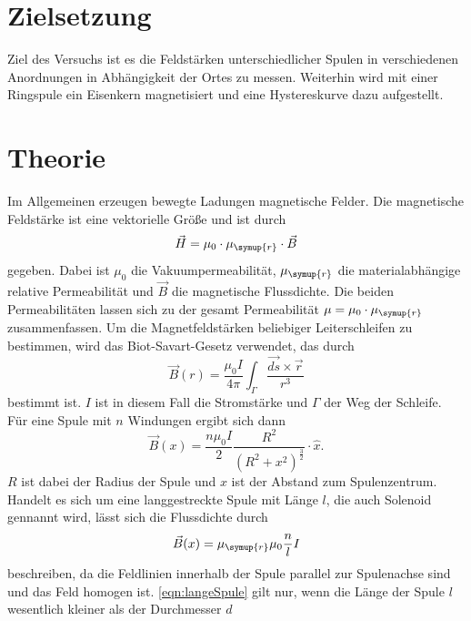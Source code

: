 \section{Zielsetzung}
\label{sec:Zielsetzung}
Ziel des Versuchs ist es die Feldstärken unterschiedlicher Spulen in verschiedenen Anordnungen in
Abhängigkeit der Ortes zu messen. Weiterhin wird mit einer Ringspule ein Eisenkern magnetisiert und eine
Hystereskurve dazu aufgestellt.

\section{Theorie}
\label{sec:Theorie}
Im Allgemeinen erzeugen bewegte Ladungen magnetische Felder. Die magnetische Feldstärke ist eine vektorielle Größe
und ist durch
\begin{equation}
    \label{eqn:magFeldstaerke}
    \vec{H} = \mu_{0}\cdot\mu_{\symup{r}}\cdot \vec{B}
\end{equation}
gegeben. Dabei ist $\mu_{0}$ die Vakuumpermeabilität, $\mu_{\symup{r}}$ die materialabhängige relative
Permeabilität und $\vec{B}$ die magnetische Flussdichte. Die beiden Permeabilitäten lassen sich zu der gesamt
Permeabilität $\mu = \mu_0 \cdot \mu_{\symup{r}}$ zusammenfassen. Um die Magnetfeldstärken beliebiger
Leiterschleifen zu bestimmen, wird das Biot-Savart-Gesetz verwendet, das durch
\begin{equation}
    \label{eqn:biotsavart}
    \vec{B}(r) = \frac{\mu_{0}I}{4\pi} \int_{\Gamma} \frac{\vec{ds}\times \vec{r}}{r^3}
\end{equation}
bestimmt ist. $I$ ist in diesem Fall die Stromstärke und $\Gamma$ der Weg der Schleife. Für eine Spule mit
$n$ Windungen ergibt sich dann
\begin{equation}
    \label{eqn:nSpule}
    \vec{B}(x) = \frac{n \mu_0 I}{2} \frac{R^2}{(R^2 + x^2)^{\frac{3}{2}}} \cdot \hat{x}.
\end{equation}
$R$ ist dabei der Radius der Spule und $x$ ist der Abstand zum Spulenzentrum. Handelt es sich um eine
langgestreckte Spule mit Länge $l$, die auch Solenoid gennannt wird, lässt sich die Flussdichte durch
\begin{equation}
    \label{eqn:langeSpule}
    \vec{B}(x) = \mu_{\symup{r}}\mu_0 \frac{n}{l} I
\end{equation}
beschreiben, da die Feldlinien innerhalb der Spule parallel zur Spulenachse sind und das Feld homogen ist.
\autoref{eqn:langeSpule} gilt nur, wenn die Länge der Spule $l$ wesentlich kleiner als der Durchmesser $d$
